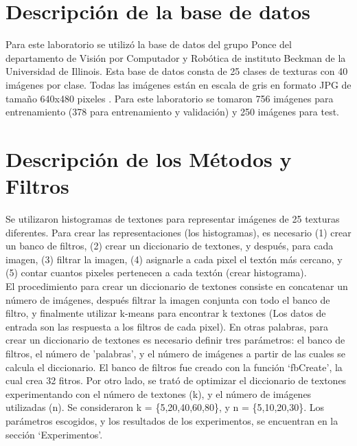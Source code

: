 \documentclass[10pt,twocolumn,letterpaper]{article}
\begin{document}
\section{Descripción de la base de datos}
Para este laboratorio se utilizó la base de datos del grupo Ponce del departamento de Visión por Computador y Robótica de instituto Beckman de la Universidad de Illinois. Esta base de datos consta de 25 clases de texturas con 40 imágenes por clase. Todas las imágenes están en escala de gris en formato JPG de tamaño 640x480 pixeles \cite{database}. Para este laboratorio se tomaron 756 imágenes para entrenamiento (378 para entrenamiento y validación) y 250 imágenes para test. 

\section{Descripción de los Métodos y Filtros}
Se utilizaron histogramas de textones para representar imágenes de 25 texturas diferentes. Para crear las representaciones (los histogramas), es necesario (1) crear un banco de filtros, (2) crear un diccionario de textones, y después, para cada imagen, (3) filtrar la imagen, (4) asignarle a cada pixel el textón más cercano, y (5) contar cuantos pixeles pertenecen a cada textón (crear histograma).\\
El procedimiento para crear un diccionario de textones consiste en concatenar un número de imágenes, después filtrar la imagen conjunta con todo el banco de filtro, y finalmente utilizar k-means para encontrar k textones (Los datos de entrada son las respuesta a los filtros de cada pixel). En otras palabras, para crear un diccionario de textones es necesario definir tres parámetros: el banco de filtros, el número de 'palabras', y el número de imágenes a partir de las cuales se calcula el diccionario. El banco de filtros fue creado con la función ‘fbCreate’, la cual crea 32 fitros. Por otro lado, se trató de optimizar el diccionario de textones experimentando con el número de textones (k), y  el número de imágenes utilizadas (n).
Se consideraron k = \{5,20,40,60,80\}, y n = \{5,10,20,30\}. Los parámetros escogidos, y los resultados de los experimentos, se encuentran en la sección ‘Experimentos’.\\
\end{document}
